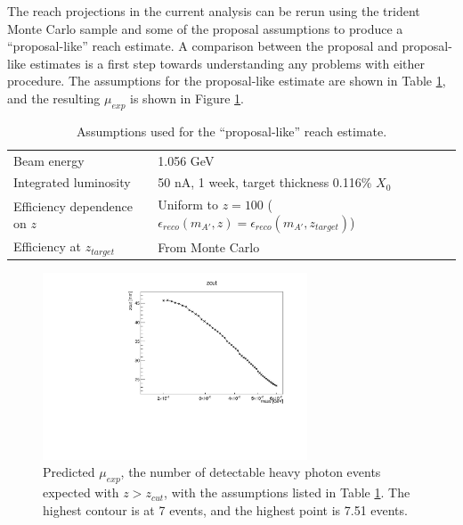 The reach projections in the current analysis can be rerun using the trident Monte Carlo sample and some of the proposal assumptions to produce a ``proposal-like'' reach estimate.
A comparison between the proposal and proposal-like estimates is a first step towards understanding any problems with either procedure.
The assumptions for the proposal-like estimate are shown in Table \ref{tab:mc_assumptions}, and the resulting $\mu_{exp}$ is shown in Figure \ref{fig:mc_detectable}.

\begin{table}[ht]
    \begin{center}
        \caption{Assumptions used for the ``proposal-like'' reach estimate.}
        \begin{tabular}{lp{}}
            \hline \hline
            Beam energy & 1.056 GeV \\
            Integrated luminosity & 50 nA, 1 week, target thickness 0.116\% $X_0$ \\
            Efficiency dependence on $z$ & Uniform to $z=100$ ($\epsilon_{reco}(m_{A'},z) = \epsilon_{reco}(m_{A'},z_{target})$) \\
            Efficiency at $z_{target}$ & From Monte Carlo \\
            \hline \hline
        \end{tabular}
        \label{tab:mc_assumptions} 
    \end{center}
\end{table}

\begin{figure}[ht]
\begin{center}
    \includegraphics[width=0.7\textwidth,page=16,angle=-90]{vertexing/figs/mc_week_mres_uniform_nosignal_output}
\end{center}
    \caption{Predicted $\mu_{exp}$, the number of detectable heavy photon events expected with $z>z_{cut}$, with the assumptions listed in Table \ref{tab:mc_assumptions}. The highest contour is at 7 events, and the highest point is 7.51 events.}
    \label{fig:mc_detectable}
\end{figure}

